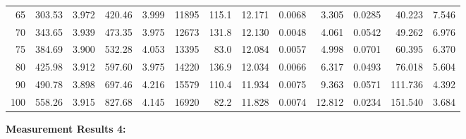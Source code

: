 \documentclass[10pt]{article}
\begin{document}
{\begin{tabular}{|r|rr|rr|rr|rr|rr|r|r|}
       65 &       303.53 &        3.972 &       420.46 &        3.999 &        11895 &        115.1 &       12.171 &       0.0068 &        3.305 &       0.0285 &       40.223 &        7.546 \\
       70 &       343.65 &        3.939 &       473.35 &        3.975 &        12673 &        131.8 &       12.130 &       0.0048 &        4.061 &       0.0542 &       49.262 &        6.976 \\
       75 &       384.69 &        3.900 &       532.28 &        4.053 &        13395 &         83.0 &       12.084 &       0.0057 &        4.998 &       0.0701 &       60.395 &        6.370 \\
       80 &       425.98 &        3.912 &       597.60 &        3.975 &        14220 &        136.9 &       12.034 &       0.0066 &        6.317 &       0.0493 &       76.018 &        5.604 \\
       90 &       490.78 &        3.898 &       697.46 &        4.216 &        15579 &        110.4 &       11.934 &       0.0075 &        9.363 &       0.0571 &      111.736 &        4.392 \\
      100 &       558.26 &        3.915 &       827.68 &        4.145 &        16920 &         82.2 &       11.828 &       0.0074 &       12.812 &       0.0234 &      151.540 &        3.684 \\
\hline
\end{tabular}
}

\vspace{3mm}

\noindent
{\large \bf Measurement Results 4:}
\vspace{3mm}
\end{document}
